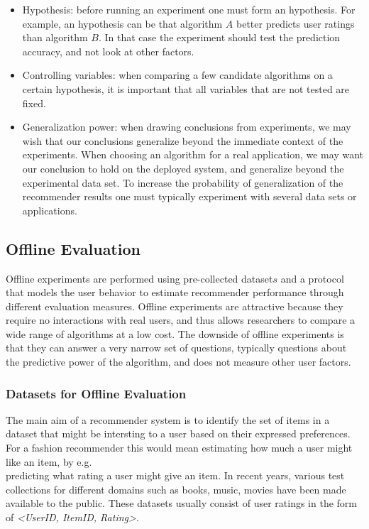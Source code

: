\begin{itemize}

\item Hypothesis: before running an experiment one must form an hypothesis. For
	example, an hypothesis can be that algorithm $A$ better predicts user ratings
	than algorithm $B$. In that case the experiment should test the prediction
	accuracy, and not look at other factors.

\item Controlling variables: when comparing a few candidate algorithms on a
	certain hypothesis, it is important that all variables that are not tested
	are fixed.

\item Generalization power: when drawing conclusions from experiments, we may
	wish that our conclusions generalize beyond the immediate context of the
	experiments. When choosing an algorithm for a real application, we may want
	our conclusion to hold on the deployed system, and generalize beyond the
	experimental data set. To increase the probability of generalization of the
	recommender results one must typically experiment with several data sets or
	applications.

\end{itemize}

\subsection{Offline Evaluation}

Offline experiments are performed using pre-collected dataset\(s\) and a protocol
that models the user behavior to estimate recommender performance through
different evaluation measures. Offline experiments are attractive because they
require no interactions with real users, and thus allows researchers to compare
a wide range of algorithms at a low cost. The downside of offline experiments
is that they can answer a very narrow set of questions, typically questions
about the predictive power of the algorithm, and does not measure other user
factors.

\subsubsection{Datasets for Offline Evaluation}

The main aim of a recommender system is to identify the set of items in a
dataset that might be intersting to a user based on their expressed
preferences. For a fashion recommender this would mean estimating how much a
user might like an item, by e.g.\\ predicting what rating a user might give an
item. In recent years, various test collections for different domains such as
books, music, movies have been made available to the public. These datasets
usually consist of user ratings in the form of \emph{<UserID, ItemID, Rating>}.

